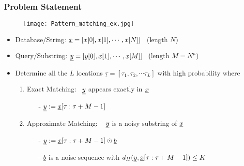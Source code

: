  \begin{frame}\frametitle{Problem Statement}
 	\vspace{-0.4cm}
	\begin{figure}[t]
		\centering
		\texttt{[image: Pattern\_matching\_ex.jpg]}
	\end{figure}
	\vspace{-12pt}
	\begin{block}{}
\begin{itemize}\itemsep3pt
	\item {\color{blue} Database/String}: $\underline{x} = [x[0], x[1], \cdots, x[N]]$ \ (length $N$)
	\item { \color{blue} Query/Substring}: $\underline{y} = [y[0], x[1], \cdots, x[M]]$ \ (length $M = N^\mu$) \vspace{2pt}
	\item Determine all the {\color{blue} $L$ locations} $\underline{\tau} = [\tau_1, \tau_2, \cdots \tau_L]$ with  {\color{blue}high probability}  where\\
	\begin{enumerate}
		\item \normalsize \alert{Exact Matching}:~  $\underline{y}$ appears {\color{blue}exactly} in $\underline{x}$
		\begin{itemize}\normalsize
				\item [-]  $\underline{y} := \underline{x}[\tau:\tau+M-1]$
		\end{itemize}  
		\item \normalsize \alert{Approximate Matching:} ~ $\underline{y}$ is a {\color{blue}noisy substring} of $\underline{x}$
		
		\begin{itemize}\itemsep5pt \normalsize
				\item [-] $\underline{y} := \underline{x}[\tau:\tau+M-1] \odot \underline{b}$ 
				\item [-] $\underline{b}$ is a noise sequence with $d_H(\underline{y},\underline{x}[\tau:\tau+M-1]) \leq K$   
		\end{itemize}
	\end{enumerate}   
\end{itemize}

	\end{block}
	 \end{frame} 
	 
